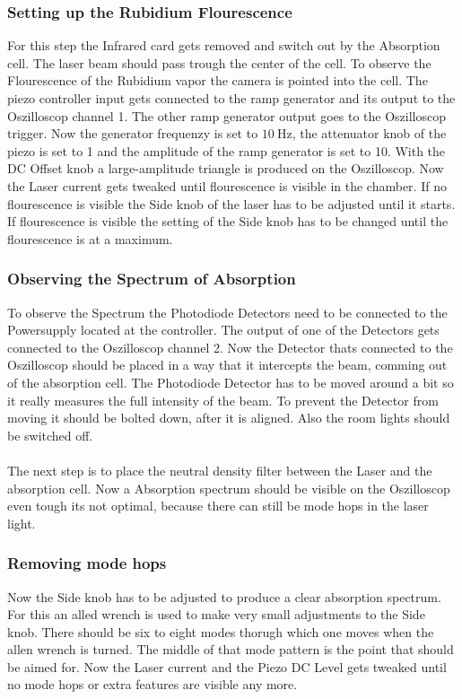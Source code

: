 \subsubsection{Setting up the Rubidium Flourescence}
For this step the Infrared card gets removed and switch out by the Absorption cell.
The laser beam should pass trough the center of the cell.
To observe the Flourescence of the Rubidium vapor the camera is pointed into the cell.
The piezo controller input gets connected to the ramp generator and its output to the Oszilloscop channel 1.
The other ramp generator output goes to the Oszilloscop trigger.
Now the generator frequenzy is set to $\SI{10}{\Hz}$, the attenuator knob of the piezo is set to 1 and the amplitude of the ramp generator is set to 10.
With the DC Offset knob a large-amplitude triangle is produced on the Oszilloscop.
Now the Laser current gets tweaked until flourescence is visible in the chamber.
If no flourescence is visible the Side knob of the laser has to be adjusted until it starts.
If flourescence is visible the setting of the Side knob has to be changed until the flourescence is at a maximum.

\subsubsection{Observing the Spectrum of Absorption}
To observe the Spectrum the Photodiode Detectors need to be connected to the Powersupply located at the controller.
The output of one of the Detectors gets connected to the Oszilloscop channel 2.
Now the Detector thats connected to the Oszilloscop should be placed in a way that it intercepts the beam, comming out of the absorption cell.
The Photodiode Detector has to be moved around a bit so it really measures the full intensity of the beam.
To prevent the Detector from moving it should be bolted down, after it is aligned.
Also the room lights should be switched off.
\\\\
The next step is to place the neutral density filter between the Laser and the absorption cell.
Now a Absorption spectrum should be visible on the Oszilloscop even tough its not optimal, because there can still be mode hops in the laser light.

\subsubsection{Removing mode hops}
Now the Side knob has to be adjusted to produce a clear absorption spectrum.
For this an alled wrench is used to make very small adjustments to the Side knob.
There should be six to eight modes thorugh which one moves when the allen wrench is turned.
The middle of that mode pattern is the point that should be aimed for.
Now the Laser current and the Piezo DC Level gets tweaked until no mode hops or extra features are visible any more.

